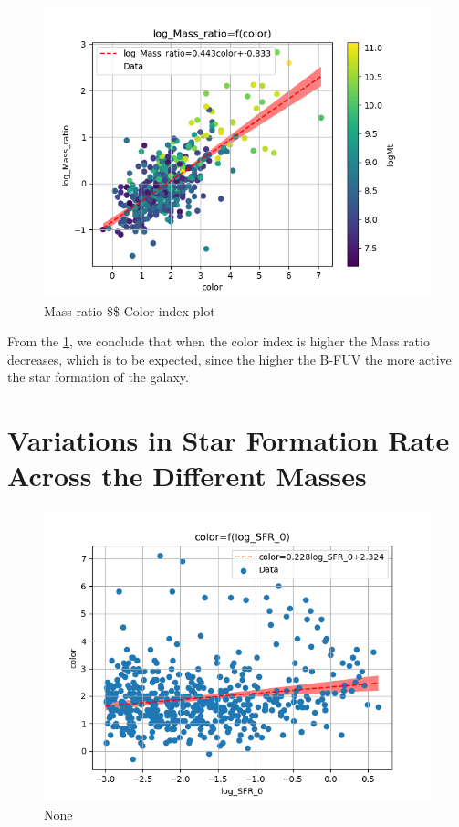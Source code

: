 \documentclass[a4paper,twocolumn]{article}
\begin{document}
\begin{figure}[!htpb]
\centering
\includegraphics[width=.9\linewidth]{./figs/color-log_Mass_ratio-color_logMt.png}
\caption{\label{fig:col_Mr}Mass ratio \$\$-Color index plot}
\end{figure}

From the \ref{fig:col_Mr}, we conclude that when the color index is higher the Mass ratio decreases, which is to be expected, since the higher the B-FUV the more active the star formation of the galaxy.



\section{Variations in Star Formation Rate Across the Different Masses}
\label{sec:org64de891}


\begin{figure}[!htpb]
\centering
\includegraphics[width=.9\linewidth]{./figs/log_SFR_0-color.png}
\caption{\label{fig:None}None}
\end{figure}
\end{document}
